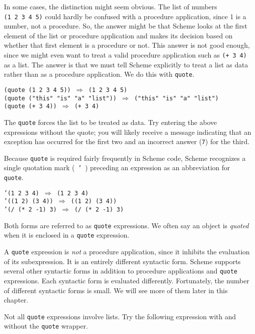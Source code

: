 In some cases, the distinction might seem obvious.
The list of numbers \texttt{(1 2 3 4 5)} could hardly be confused with a
procedure application, since 1 is a number, not a procedure.
So, the answer might be that Scheme looks at the first element of the
list or procedure application and makes its decision based on whether
that first element is a procedure or not.
This answer is not good enough, since we might even want to treat a valid
procedure application such as \texttt{(+ 3 4)} as a list.
The answer is that we must tell Scheme explicitly to treat a list as
data rather than as a procedure application.
We do this with \label{start_s15}\label{start_s16}\texttt{quote}.


\begin{alltt}
(quote (1 2 3 4 5)) \(\Rightarrow\) (1 2 3 4 5)
(quote ("this" "is" "a" "list")) \(\Rightarrow\) ("this" "is" "a" "list")
(quote (+ 3 4)) \(\Rightarrow\) (+ 3 4)
\end{alltt}


The \texttt{quote} forces the list to be treated as data.
Try entering the above expressions without the quote; you will likely
receive a message indicating that an exception has occurred for the first
two and an incorrect answer (\texttt{7}) for the third.


Because \texttt{quote} is required fairly frequently in Scheme code, Scheme
recognizes a single quotation mark ( \texttt{'} ) preceding
an expression as an abbreviation for \texttt{quote}.


\begin{alltt}
'(1 2 3 4) \(\Rightarrow\) (1 2 3 4)
'((1 2) (3 4)) \(\Rightarrow\) ((1 2) (3 4))
'(/ (* 2 -1) 3) \(\Rightarrow\) (/ (* 2 -1) 3)
\end{alltt}


Both forms are referred to as \texttt{quote} expressions.
We often say an object is \textit{quoted} when it is enclosed in
a \texttt{quote} expression.


A \texttt{quote} expression is \textit{not} a procedure application, since
it inhibits the evaluation of its subexpression.
It is an entirely different syntactic form.
Scheme supports several other \label{start_s17}syntactic forms in addition to
procedure applications and \texttt{quote} expressions.
Each syntactic form is evaluated differently.
Fortunately, the number of different syntactic forms is small.
We will see more of them later in this chapter.


Not all \texttt{quote} expressions involve lists.
Try the following expression with and without the \texttt{quote}
wrapper.


